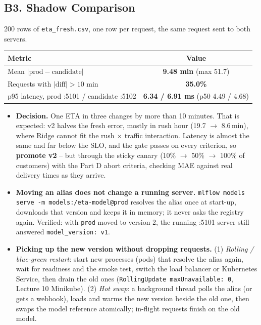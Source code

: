 \documentclass[10pt]{article}
\newcommand{\code}[1]{\texttt{#1}}
\begin{document}
\subsection{B3. Shadow Comparison}
200 rows of \code{eta\_fresh.csv}, one row per request, the same request sent to both servers.
\begin{center}
\begin{tabular}{|l|c|}
\hline
\textbf{Metric} & \textbf{Value} \\ \hline
Mean $|\text{prod}-\text{candidate}|$ & \textbf{9.48 min} (max 51.7) \\
Requests with $|\text{diff}| > 10$ min & \textbf{35.0\%} \\
p95 latency, prod :5101 / candidate :5102 & \textbf{6.34 / 6.91 ms} (p50 4.49 / 4.68) \\ \hline
\end{tabular}
\end{center}
\begin{itemize}
  \item \textbf{Decision.} One ETA in three changes by more than 10 minutes. That is expected: v2 halves the fresh error, mostly in rush hour
  (19.7 $\to$ 8.6\,min), where Ridge cannot fit the rush $\times$ traffic interaction. Latency is almost the same and far below the SLO, and the
  gate passes on every criterion, so \textbf{promote v2} -- but through the sticky canary (10\% $\to$ 50\% $\to$ 100\% of customers) with the
  Part D abort criteria, checking MAE against real delivery times as they arrive.
  \item \textbf{Moving an alias does not change a running server.} \code{mlflow models serve -m models:/eta-model@prod} resolves the alias once at
  start-up, downloads that version and keeps it in memory; it never asks the registry again. Verified: with \code{prod} moved to version 2, the running
  :5101 server still answered \code{model\_version: v1}.
  \item \textbf{Picking up the new version without dropping requests.} (1) \emph{Rolling / blue-green restart}: start new processes (pods) that resolve the
  alias again, wait for readiness and the smoke test, switch the load balancer or Kubernetes Service, then drain the old ones
  (\code{RollingUpdate maxUnavailable: 0}, Lecture 10 Minikube). (2) \emph{Hot swap}: a background thread polls the alias (or gets a webhook), loads and
  warms the new version beside the old one, then swaps the model reference atomically; in-flight requests finish on the old model.
\end{itemize}
\end{document}
